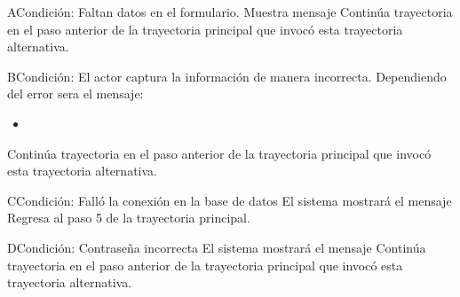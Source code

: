 	\begin{UCtrayectoriaA}{A}{Condición: Faltan datos en el formulario.}
		\UCpaso[\UCsist] Muestra mensaje 
		\UCpaso[\UCsist] Continúa trayectoria en el paso anterior de la trayectoria  principal que invocó esta trayectoria alternativa. 
	\end{UCtrayectoriaA}
	\begin{UCtrayectoriaA}{B}{Condición: El actor captura la información de manera incorrecta.}
		\UCpaso[\UCsist] Dependiendo del error sera el mensaje:
			\begin{itemize}
				\item {}
			\end{itemize}
		\UCpaso[\UCsist] Continúa trayectoria en el paso anterior de la trayectoria principal que invocó esta trayectoria alternativa. 
	\end{UCtrayectoriaA}
	\begin{UCtrayectoriaA}{C}{Condición: Falló la conexión en la base de datos}
		\UCpaso[\UCsist] El sistema mostrará el mensaje 
		\UCpaso[\UCsist] Regresa al paso 5 de la trayectoria principal. 
	\end{UCtrayectoriaA}
	\begin{UCtrayectoriaA}{D}{Condición: Contraseña incorrecta}
		\UCpaso[\UCsist] El sistema mostrará el mensaje 
		\UCpaso[\UCsist] Continúa trayectoria en el paso anterior de la trayectoria  principal que invocó esta trayectoria alternativa. 
	\end{UCtrayectoriaA}
